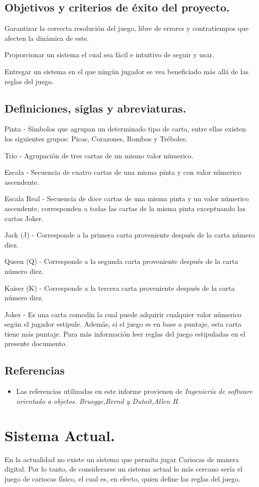 \documentclass[60pt]{article}
\begin{document}
\subsection{Objetivos y criterios de éxito del proyecto.}\label{cap:objetivos}
Garantizar la correcta resolución del juego, libre de errores y contratiempos que afecten la dinámica de este.

Proporcionar un sistema el cual sea fácil e intuitivo de seguir y usar.

Entregar un sistema en el que ningún jugador se vea beneficiado más allá de las reglas del juego.
\subsection{Definiciones, siglas y abreviaturas.}\label{cap:definiciones}
Pinta - Símbolos que agrupan un determinado tipo de carta, entre ellas existen los siguientes grupos: Picas, Corazones, Rombos y Tréboles.

Trio - Agrupación de tres cartas de un mismo valor númerico.

Escala - Secuencia de cuatro cartas de una misma pinta y con valor númerico ascendente.

Escala Real - Secuencia de doce cartas de una misma pinta y un valor númerico ascendente, corresponden a todas las cartas de la misma pinta exceptuando las cartas Joker.

Jack (J) - Corresponde a la primera carta proveniente después de la carta número diez.

Queen (Q) - Corresponde a la segunda carta proveniente después de la carta número diez.

Kaiser (K) - Corresponde a la tercera carta proveniente después de la carta número diez.

Joker - Es una carta comodín la cual puede adquirir cualquier valor númerico según el jugador estipule. Además, si el juego es en base a puntaje, esta carta tiene más puntaje. Para más información leer reglas del juego estipuladas en el presente documento.
\subsection{Referencias}
\begin{itemize}
    \item Las referencias utilizadas en este informe provienen de \textit{Ingeniería de software orientado a objetos. Bruegge,Bernd y Dutoit,Allen H.} \cite{oop}
\end{itemize}
\section{Sistema Actual.}\label{cap:sistemaActual}
En la actualidad no existe un sistema que permita jugar Cariocas de manera digital. Por lo tanto, de considerarse un sistema actual lo más cercano sería el juego de cariocas físico, el cual es, en efecto, quien define las reglas del juego.
\end{document}
